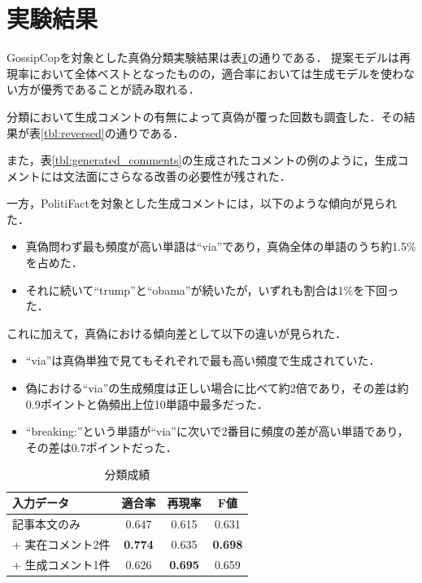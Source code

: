 \section{実験結果}
\label{sec:result}
GossipCopを対象とした真偽分類実験結果は表\ref{tbl:classify_results}の通りである．
提案モデルは再現率において全体ベストとなったものの，適合率においては生成モデルを使わない方が優秀であることが読み取れる．

分類において生成コメントの有無によって真偽が覆った回数も調査した．その結果が表\ref{tbl:reversed}の通りである．

また，表\ref{tbl:generated_comments}の生成されたコメントの例のように，生成コメントには文法面にさらなる改善の必要性が残された．

一方，PolitiFactを対象とした生成コメントには，以下のような傾向が見られた．
\begin{itemize}
    \item 真偽問わず最も頻度が高い単語は``via''であり，真偽全体の単語のうち約1.5\%を占めた．
    \item それに続いて``trump''と``obama''が続いたが，いずれも割合は1\%を下回った．
\end{itemize}

これに加えて，真偽における傾向差として以下の違いが見られた．

\begin{itemize}
    \item ``via''は真偽単独で見てもそれぞれで最も高い頻度で生成されていた．
    \item 偽における``via''の生成頻度は正しい場合に比べて約2倍であり，その差は約0.9ポイントと偽頻出上位10単語中最多だった．
    \item ``breaking:''という単語が``via''に次いで2番目に頻度の差が高い単語であり，その差は0.7ポイントだった．
\end{itemize}


\begin{table}
    \renewcommand{\arraystretch}{1.3}
    \caption{分類成績}
    \label{tbl:classify_results}
    \centering
    \begin{tabular}{lccc}
        \hline
        入力データ           & 適合率 & 再現率 & F値 \\ \hline
        記事本文のみ         & 0.647     & 0.615  & 0.631    \\
        + 実在コメント2件  & \textbf{0.774}     & 0.635  & \textbf{0.698}    \\
        + 生成コメント1件 & 0.626     & \textbf{0.695}  & 0.659    \\ \hline
    \end{tabular}
\end{table}


